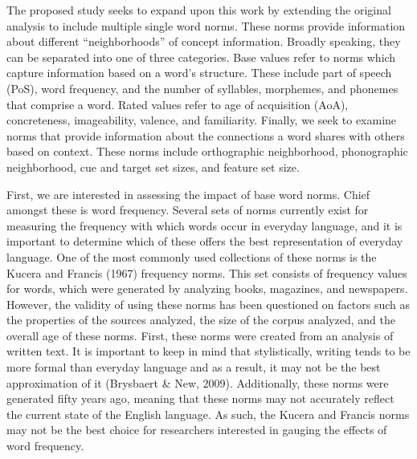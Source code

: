 \documentclass[english,man]{apa6}
\theoremstyle{definition}
\theoremstyle{definition}
\theoremstyle{definition}
\theoremstyle{remark}
\begin{document}
The proposed study seeks to expand upon this work by extending the
original analysis to include multiple single word norms. These norms
provide information about different \enquote{neighborhoods} of concept
information. Broadly speaking, they can be separated into one of three
categories. Base values refer to norms which capture information based
on a word's structure. These include part of speech (PoS), word
frequency, and the number of syllables, morphemes, and phonemes that
comprise a word. Rated values refer to age of acquisition (AoA),
concreteness, imageability, valence, and familiarity. Finally, we seek
to examine norms that provide information about the connections a word
shares with others based on context. These norms include orthographic
neighborhood, phonographic neighborhood, cue and target set sizes, and
feature set size.

First, we are interested in assessing the impact of base word norms.
Chief amongst these is word frequency. Several sets of norms currently
exist for measuring the frequency with which words occur in everyday
language, and it is important to determine which of these offers the
best representation of everyday language. One of the most commonly used
collections of these norms is the Kucera and Francis (1967) frequency
norms. This set consists of frequency values for words, which were
generated by analyzing books, magazines, and newspapers. However, the
validity of using these norms has been questioned on factors such as the
properties of the sources analyzed, the size of the corpus analyzed, and
the overall age of these norms. First, these norms were created from an
analysis of written text. It is important to keep in mind that
stylistically, writing tends to be more formal than everyday language
and as a result, it may not be the best approximation of it (Brysbaert
\& New, 2009). Additionally, these norms were generated fifty years ago,
meaning that these norms may not accurately reflect the current state of
the English language. As such, the Kucera and Francis norms may not be
the best choice for researchers interested in gauging the effects of
word frequency.
\end{document}
